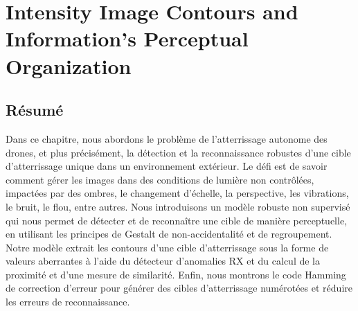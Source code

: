 \chapter{Intensity Image Contours and Information's Perceptual Organization} \label{ch:landing_target_detection}
%

\section*{Résumé}
\noindent Dans ce chapitre, nous abordons le problème de l'atterrissage autonome des drones, et plus précisément, la détection et la reconnaissance robustes d'une cible d'atterrissage unique dans un environnement extérieur. Le défi est de savoir comment gérer les images dans des conditions de lumière non contrôlées, impactées par des ombres, le changement d'échelle, la perspective, les vibrations, le bruit, le flou, entre autres. Nous introduisons un modèle robuste non supervisé qui nous permet de détecter et de reconnaître une cible de manière perceptuelle, en utilisant les principes de Gestalt de non-accidentalité et de regroupement. Notre modèle extrait les contours d'une cible d'atterrissage sous la forme de valeurs aberrantes à l'aide du détecteur d'anomalies RX et du calcul de la proximité et d'une mesure de similarité. Enfin, nous montrons le code Hamming de correction d'erreur pour générer des cibles d'atterrissage numérotées et réduire les erreurs de reconnaissance.


